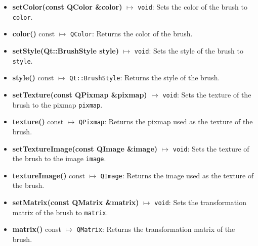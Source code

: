 \documentclass{report}
\begin{document}
    \pagebreak 
    \begin{itemize}
        \item \textbf{setColor(const QColor \&color)} $\mapsto$ \texttt{void}: Sets the color of the brush to \texttt{color}.
        \item \textbf{color()} const $\mapsto$ \texttt{QColor}: Returns the color of the brush.
        \item \textbf{setStyle(Qt::BrushStyle style)} $\mapsto$ \texttt{void}: Sets the style of the brush to \texttt{style}.
        \item \textbf{style()} const $\mapsto$ \texttt{Qt::BrushStyle}: Returns the style of the brush.
        \item \textbf{setTexture(const QPixmap \&pixmap)} $\mapsto$ \texttt{void}: Sets the texture of the brush to the pixmap \texttt{pixmap}.
        \item \textbf{texture()} const $\mapsto$ \texttt{QPixmap}: Returns the pixmap used as the texture of the brush.
        \item \textbf{setTextureImage(const QImage \&image)} $\mapsto$ \texttt{void}: Sets the texture of the brush to the image \texttt{image}.
        \item \textbf{textureImage()} const $\mapsto$ \texttt{QImage}: Returns the image used as the texture of the brush.
        \item \textbf{setMatrix(const QMatrix \&matrix)} $\mapsto$ \texttt{void}: Sets the transformation matrix of the brush to \texttt{matrix}.
        \item \textbf{matrix()} const $\mapsto$ \texttt{QMatrix}: Returns the transformation matrix of the brush.
    \end{itemize}
\end{document}
